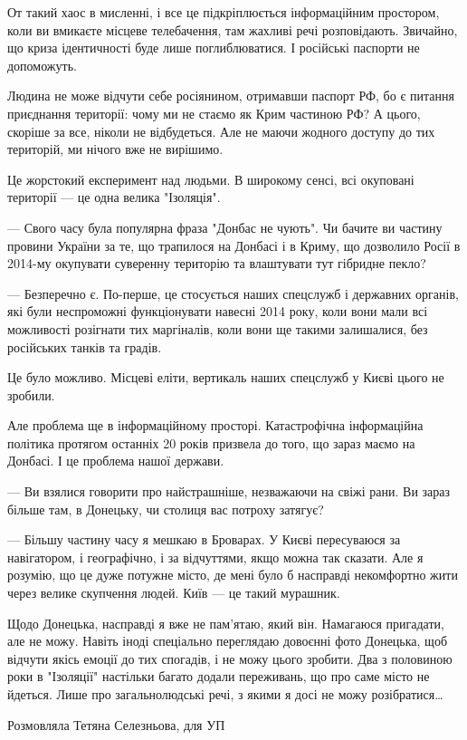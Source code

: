 От такий хаос в мисленні, і все це підкріплюється інформаційним простором, коли
ви вмикаєте місцеве телебачення, там жахливі речі розповідають. Звичайно, що
криза ідентичності буде лише поглиблюватися. І російські паспорти не
допоможуть. 

Людина не може відчути себе росіянином, отримавши паспорт РФ, бо є питання
приєднання території: чому ми не стаємо як Крим частиною РФ? А цього, скоріше
за все, ніколи не відбудеться. Але не маючи жодного доступу до тих територій,
ми нічого вже не вирішимо.

Це жорстокий експеримент над людьми. В широкому сенсі, всі окуповані території
— це одна велика "Ізоляція".

— Свого часу була популярна фраза "Донбас не чують". Чи бачите ви частину
провини України за те, що трапилося на Донбасі і в Криму, що дозволило Росії в
2014-му окупувати суверенну територію та влаштувати тут гібридне пекло?

— Безперечно є. По-перше, це стосується наших спецслужб і державних органів,
які були неспроможні функціонувати навесні 2014 року, коли вони мали всі
можливості розігнати тих маргіналів, коли вони ще такими залишалися, без
російських танків та градів. 

Це було можливо. Місцеві еліти, вертикаль наших спецслужб у Києві цього не
зробили. 

Але проблема ще в інформаційному просторі. Катастрофічна інформаційна політика
протягом останніх 20 років призвела до того, що зараз маємо на Донбасі. І це
проблема нашої держави.

— Ви взялися говорити про найстрашніше, незважаючи на свіжі рани. Ви зараз
більше там, в Донецьку, чи столиця вас потроху затягує?

— Більшу частину часу я мешкаю в Броварах. У Києві пересуваюся за навігатором,
і географічно, і за відчуттями, якщо можна так сказати. Але я розумію, що це
дуже потужне місто, де мені було б насправді некомфортно жити через велике
скупчення людей. Київ — це такий мурашник.

Щодо Донецька, насправді я вже не пам’ятаю, який він. Намагаюся пригадати, але
не можу. Навіть іноді спеціально переглядаю довоєнні фото Донецька, щоб відчути
якісь емоції до тих спогадів, і не можу цього зробити. Два з половиною роки в
"Ізоляції" настільки багато додали переживань, що про саме місто не йдеться.
Лише про загальнолюдські речі, з якими я досі не можу розібратися…

Розмовляла Тетяна Селезньова, для УП

